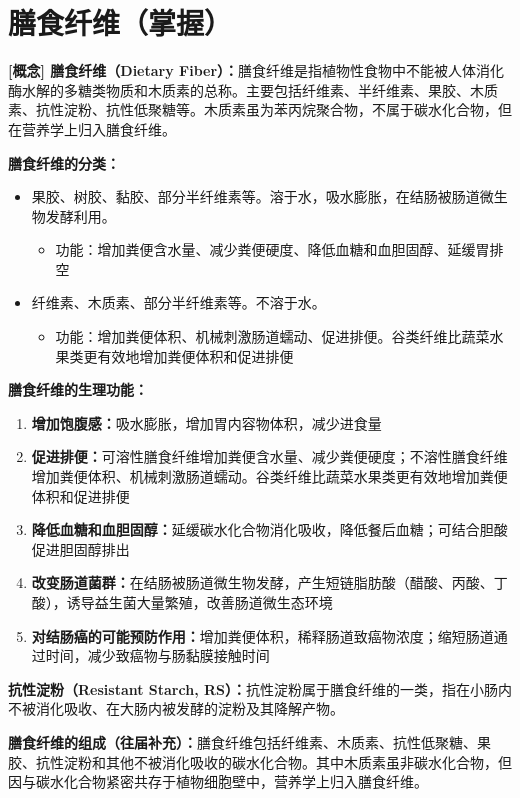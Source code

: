 \section{膳食纤维（掌握）}

\begin{keybox}
\textbf{[概念] 膳食纤维（Dietary Fiber）：}膳食纤维是指植物性食物中不能被人体消化酶水解的多糖类物质和木质素的总称。主要包括纤维素、半纤维素、果胶、木质素、抗性淀粉、抗性低聚糖等。木质素虽为苯丙烷聚合物，不属于碳水化合物，但在营养学上归入膳食纤维。

\textbf{膳食纤维的分类：}
\begin{itemize}[leftmargin=*]
    \item {}果胶、树胶、黏胶、部分半纤维素等。溶于水，吸水膨胀，在结肠被肠道微生物发酵利用。
    \begin{itemize}
        \item 功能：增加粪便含水量、减少粪便硬度、降低血糖和血胆固醇、延缓胃排空
    \end{itemize}
    \item {}纤维素、木质素、部分半纤维素等。不溶于水。
    \begin{itemize}
        \item 功能：增加粪便体积、机械刺激肠道蠕动、促进排便。谷类纤维比蔬菜水果类更有效地增加粪便体积和促进排便
    \end{itemize}
\end{itemize}

\textbf{膳食纤维的生理功能：}
\begin{enumerate}[leftmargin=*]
    \item \textbf{增加饱腹感：}吸水膨胀，增加胃内容物体积，减少进食量
    \item \textbf{促进排便：}可溶性膳食纤维增加粪便含水量、减少粪便硬度；不溶性膳食纤维增加粪便体积、机械刺激肠道蠕动。谷类纤维比蔬菜水果类更有效地增加粪便体积和促进排便
    \item \textbf{降低血糖和血胆固醇：}延缓碳水化合物消化吸收，降低餐后血糖；可结合胆酸促进胆固醇排出
    \item \textbf{改变肠道菌群：}在结肠被肠道微生物发酵，产生短链脂肪酸（醋酸、丙酸、丁酸），诱导益生菌大量繁殖，改善肠道微生态环境
    \item \textbf{对结肠癌的可能预防作用：}增加粪便体积，稀释肠道致癌物浓度；缩短肠道通过时间，减少致癌物与肠黏膜接触时间
\end{enumerate}
\end{keybox}

\begin{tipbox}
\textbf{抗性淀粉（Resistant Starch, RS）：}抗性淀粉属于膳食纤维的一类，指在小肠内不被消化吸收、在大肠内被发酵的淀粉及其降解产物。

\textbf{膳食纤维的组成（往届补充）：}膳食纤维包括纤维素、木质素、抗性低聚糖、果胶、抗性淀粉和其他不被消化吸收的碳水化合物。其中木质素虽非碳水化合物，但因与碳水化合物紧密共存于植物细胞壁中，营养学上归入膳食纤维。
\end{tipbox}

